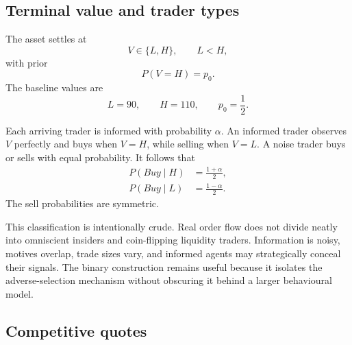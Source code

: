 \documentclass[11pt]{article}
\begin{document}
\subsection{Terminal value and trader types}

The asset settles at
\begin{equation}
V \in \{L,H\}, \qquad L < H,
\end{equation}
with prior
\begin{equation}
P(V=H)=p_0.
\end{equation}
The baseline values are
\begin{equation}
L=90, \qquad H=110, \qquad p_0=\frac{1}{2}.
\end{equation}

Each arriving trader is informed with probability $\alpha$. An informed trader observes $V$ perfectly and buys when $V=H$, while selling when $V=L$. A noise trader buys or sells with equal probability. It follows that
\begin{align}
P(Buy\mid H) &= \frac{1+\alpha}{2}, \\
P(Buy\mid L) &= \frac{1-\alpha}{2}.
\end{align}
The sell probabilities are symmetric.

This classification is intentionally crude. Real order flow does not divide neatly into omniscient insiders and coin-flipping liquidity traders. Information is noisy, motives overlap, trade sizes vary, and informed agents may strategically conceal their signals. The binary construction remains useful because it isolates the adverse-selection mechanism without obscuring it behind a larger behavioural model.

\subsection{Competitive quotes}
\end{document}
